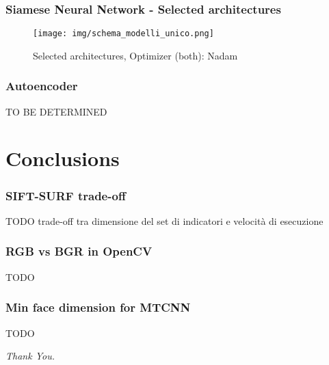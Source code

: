 \documentclass{beamer}
\begin{document}
	\begin{frame}
		\frametitle {Siamese Neural Network - Selected architectures}
		\begin{figure}
			\centering
			\texttt{[image: img/schema\_modelli\_unico.png]}
    		\caption{Selected architectures, Optimizer (both): Nadam}
    		\label{fig:selected_architectures}
		\end{figure}
	\end{frame}
	
	\begin{frame}
		\frametitle{Autoencoder}
		TO BE DETERMINED
	\end{frame}
	
	\section{Conclusions}
	\begin{frame}
		\frametitle{SIFT-SURF trade-off}
		TODO trade-off tra dimensione del set di indicatori e velocità di esecuzione
	\end{frame}
	
	\begin{frame}
		\frametitle{RGB vs BGR in OpenCV}
		TODO
	\end{frame}
	
	\begin{frame}
		\frametitle{Min face dimension for MTCNN}
		TODO
	\end{frame}
	
	\begin{frame}
		\centering \Huge
		\emph{Thank You.}
	\end{frame}
\end{document}
